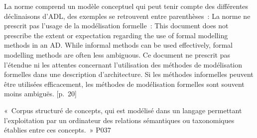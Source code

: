{La norme comprend un modèle conceptuel qui peut tenir compte des différentes déclinaisons d'ADL, des exemples se retrouvent entre parenthèses~:
La norme ne prescrit pas l'usage de la modélisation formelle~:
\quoteenfr
{This document does not prescribe the extent or expectation regarding the use of formal modelling methods in an AD. While informal methods can be used effectively, formal modelling methods are often less ambiguous.}
{Ce document ne prescrit pas l'étendue ni les attentes concernant l'utilisation des méthodes de modélisation formelles dans une description d'architecture. Si les méthodes informelles peuvent être utilisées efficacement, les méthodes de modélisation formelles sont souvent moins ambiguës.}
{[p.~20]}

}{}

{«~Corpus structuré de concepts, qui est modélisé dans un langage permettant l'exploitation par un ordinateur des relations sémantiques ou taxonomiques établies entre ces concepts.~» \cite{Gdt_OntInfo_1}}{P037}

